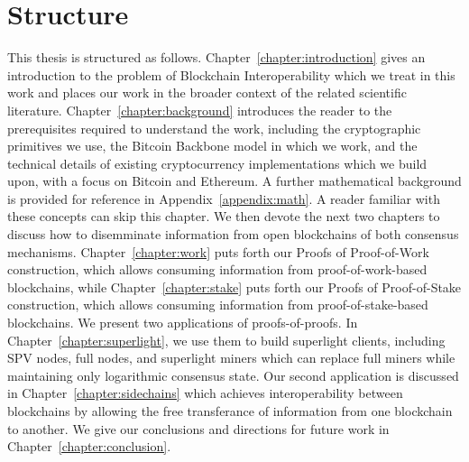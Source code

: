 \section*{Structure}

This thesis is structured as follows. Chapter~\ref{chapter:introduction} gives
an introduction to the problem of Blockchain Interoperability which we treat in
this work and places our work in the broader context of the related scientific
literature. Chapter~\ref{chapter:background} introduces the reader to the
prerequisites required to understand the work, including the cryptographic
primitives we use, the Bitcoin Backbone model in which we work, and the
technical details of existing cryptocurrency implementations which we build
upon, with a focus on Bitcoin and Ethereum. A further mathematical background is
provided for reference in Appendix~\ref{appendix:math}. A reader familiar with
these concepts can skip this chapter. We then devote the next two chapters to
discuss how to disemminate information from open blockchains of both consensus
mechanisms. Chapter~\ref{chapter:work} puts forth our Proofs of Proof-of-Work
construction, which allows consuming information from proof-of-work-based
blockchains, while Chapter~\ref{chapter:stake} puts forth our Proofs of
Proof-of-Stake construction, which allows consuming information from
proof-of-stake-based blockchains. We present two applications of
proofs-of-proofs. In Chapter~\ref{chapter:superlight}, we use them to build
superlight clients, including SPV nodes, full nodes, and superlight miners which
can replace full miners while maintaining only logarithmic consensus state. Our
second application is discussed in Chapter~\ref{chapter:sidechains} which
achieves interoperability between blockchains by allowing the free transferance
of information from one blockchain to another. We give our conclusions and
directions for future work in Chapter~\ref{chapter:conclusion}.
